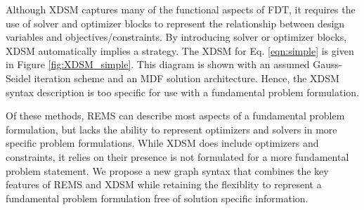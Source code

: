     Although XDSM captures many of the functional aspects of FDT, it 
    requires the use of solver and optimizer blocks to represent 
    the relationship between design variables and objectives/constraints. 
    By introducing solver or optimizer blocks, XDSM automatically implies a strategy. 
The XDSM for Eq. \ref{eqn:simple} is 
    given in Figure \ref{fig:XDSM_simple}. This diagram is shown with an 
    assumed Gauss-Seidel iteration scheme and an MDF solution architecture. 
    Hence, the XDSM syntax description is too specific for use with a fundamental problem formulation. 

    Of these methods, REMS can describe most aspects of a fundamental 
    problem formulation, but lacks the ability to represent optimizers and 
    solvers in more specific problem formulations. While XDSM does include 
    optimizers and constraints, it relies on their presence is not formulated  
    for a more fundamental problem statement. We propose a new graph syntax that 
    combines the key features of REMS and XDSM while retaining the flexiblity to 
    represent a fundamental problem formulation free of solution specific information. 

